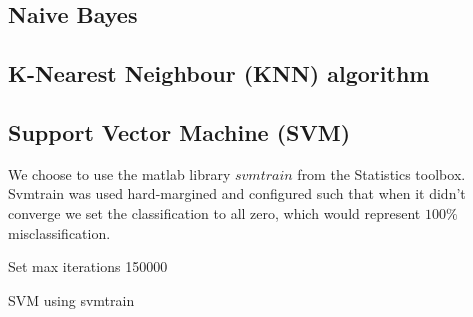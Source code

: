 \subsection{Naive Bayes}


\subsection{K-Nearest Neighbour (KNN) algorithm}

\subsection{Support Vector Machine (SVM)}
We choose to use the matlab library $svmtrain$ \citep{svmtrain_ref} from the Statistics toolbox. Svmtrain was used hard-margined and configured such that when it didn't converge we set the classification to all zero, which would represent $100\%$ misclassification. \\
\begin{algorithm}[H]
\label{algorithm:SVM}
\SetAlgoLined
{}

Set max iterations 150000 \\
 \caption{SVM using svmtrain}
\end{algorithm}



